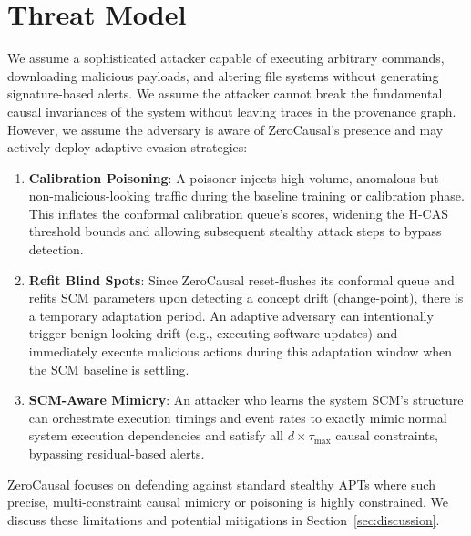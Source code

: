 \section{Threat Model}
We assume a sophisticated attacker capable of executing arbitrary commands, downloading malicious payloads, and altering file systems without generating signature-based alerts. We assume the attacker cannot break the fundamental causal invariances of the system without leaving traces in the provenance graph. However, we assume the adversary is aware of ZeroCausal's presence and may actively deploy adaptive evasion strategies:

\begin{enumerate}
\item \textbf{Calibration Poisoning}: A poisoner injects high-volume, anomalous but non-malicious-looking traffic during the baseline training or calibration phase. This inflates the conformal calibration queue's scores, widening the H-CAS threshold bounds and allowing subsequent stealthy attack steps to bypass detection.
\item \textbf{Refit Blind Spots}: Since ZeroCausal reset-flushes its conformal queue and refits SCM parameters upon detecting a concept drift (change-point), there is a temporary adaptation period. An adaptive adversary can intentionally trigger benign-looking drift (e.g., executing software updates) and immediately execute malicious actions during this adaptation window when the SCM baseline is settling.
\item \textbf{SCM-Aware Mimicry}: An attacker who learns the system SCM's structure can orchestrate execution timings and event rates to exactly mimic normal system execution dependencies and satisfy all $d \times \tau_{\max}$ causal constraints, bypassing residual-based alerts.
\end{enumerate}
ZeroCausal focuses on defending against standard stealthy APTs where such precise, multi-constraint causal mimicry or poisoning is highly constrained. We discuss these limitations and potential mitigations in Section~\ref{sec:discussion}.
